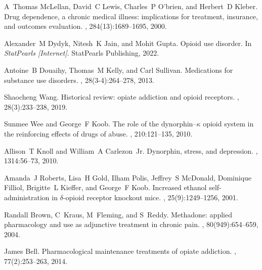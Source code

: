 \documentclass[10pt]{article}
\begin{document}
		\begin{thebibliography}{10}
			
			A~Thomas McLellan, David~C Lewis, Charles~P O'brien, and Herbert~D Kleber.
			\newblock Drug dependence, a chronic medical illness: implications for
			treatment, insurance, and outcomes evaluation.
			, 284(13):1689--1695, 2000.
			
			Alexander~M Dydyk, Nitesh~K Jain, and Mohit Gupta.
			\newblock Opioid use disorder.
			\newblock In {\em StatPearls [Internet]}. StatPearls Publishing, 2022.
			
			Antoine~B Douaihy, Thomas~M Kelly, and Carl Sullivan.
			\newblock Medications for substance use disorders.
			, 28(3-4):264--278, 2013.
			
			Shaocheng Wang.
			\newblock Historical review: opiate addiction and opioid receptors.
			, 28(3):233--238, 2019.
			
			Sunmee Wee and George~F Koob.
			\newblock The role of the dynorphin--$\kappa$ opioid system in the reinforcing
			effects of drugs of abuse.
			, 210:121--135, 2010.
			
			Allison~T Knoll and William~A Carlezon~Jr.
			\newblock Dynorphin, stress, and depression.
			, 1314:56--73, 2010.
			
			Amanda~J Roberts, Lisa~H Gold, Ilham Polis, Jeffrey~S McDonald, Dominique
			Filliol, Brigitte~L Kieffer, and George~F Koob.
			\newblock Increased ethanol self-administration in $\delta$-opioid receptor
			knockout mice.
			,
			25(9):1249--1256, 2001.
			
			Randall Brown, C~Kraus, M~Fleming, and S~Reddy.
			\newblock Methadone: applied pharmacology and use as adjunctive treatment in
			chronic pain.
			, 80(949):654--659, 2004.
			
			James Bell.
			\newblock Pharmacological maintenance treatments of opiate addiction.
			, 77(2):253--263, 2014.
			

\end{thebibliography}
\end{document}

